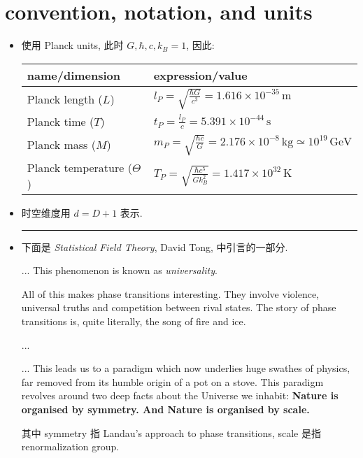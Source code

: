 \chapter*{convention, notation, and units}
\begin{itemize}
	\item 使用 Planck units, 此时 $G, \hbar, c, k_B = 1$, 因此:
	
	\begin{center}
		\begin{tabularx}{\linewidth}{XX}
			\toprule 
			name/dimension & expression/value \\
			\midrule 
			Planck length ($L$) & $l_P = \sqrt{\frac{\hbar G}{c^3}} = 1.616 \times 10^{- 35} \, \text{m}$ \\
			Planck time ($T$) & $t_P = \frac{l_P}{c} = 5.391 \times 10^{- 44} \, \text{s}$ \\
			Planck mass ($M$) & $m_P = \sqrt{\frac{\hbar c}{G}} = 2.176 \times 10^{- 8} \, \text{kg} \simeq 10^{19} \, \text{GeV}$ \\
			Planck temperature ($\Theta$) & $T_P = \sqrt{\frac{\hbar c^5}{G k_B^2}} = 1.417 \times 10^{32} \, \text{K}$ \\
			\bottomrule
		\end{tabularx}
	\end{center}
	
	\item 时空维度用 $d = D + 1$ 表示.
	
	\noindent\rule[0.5ex]{\linewidth}{0.5pt} %
	
	\item 下面是 \textit{Statistical Field Theory}, David Tong, 中引言的一部分.
	
	\begin{tcolorbox}
		... This phenomenon is known as \textit{universality}.
		
		All of this makes phase transitions interesting. They involve violence, universal truths
		and competition between rival states. The story of phase transitions is, quite literally,
		the song of fire and ice.
		
		...
		
		... This leads us to a paradigm which now underlies huge swathes of physics, far removed from its humble origin of a pot on a stove. This paradigm revolves around two deep facts about the Universe we inhabit: \textbf{Nature is organised by symmetry. And Nature is organised by scale.}
	\end{tcolorbox}
	
	其中 symmetry 指 Landau's approach to phase transitions, scale 是指 renormalization group.
\end{itemize}
